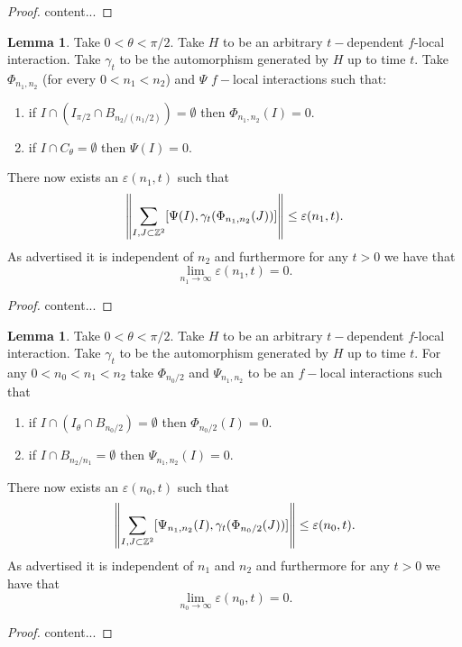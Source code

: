 \documentclass[12pt,a4paper,twoside]{article}
\newcommand{\ZZ}{\mathbb Z}
\theoremstyle{definition}
\newtheorem{lemma}[theorem]{Lemma}
\numberwithin{equation}{section}
\begin{document}
\begin{proof}
	content...
\end{proof}
\begin{lemma}\label{lem:Bound2}
	Take $0<\theta<\pi/2$. Take $H$ to be an arbitrary $t-$dependent $f$-local interaction. Take $\gamma_t$ to be the automorphism generated by $H$ up to time $t$. Take $\Phi_{n_1,n_2}$ (for every $0<n_1<n_2$) and $\Psi$ $f-$local interactions such that:
	\begin{enumerate}
		\item if $I\cap (I_{\pi/2}\cap B_{n_2/(n_1/2)})=\emptyset$ then $\Phi_{n_1,n_2}(I)=0.$
		\item if $I\cap C_{\theta}=\emptyset$ then $\Psi(I)=0.$
	\end{enumerate}
	There now exists an $\varepsilon(n_1,t)$ such that
	\begin{equation}
		\norm{\sum_{I,J\subset\ZZ^2}[\Psi(I),\gamma_t(\Phi_{n_1,n_2}(J))]}\leq\varepsilon(n_1,t).
	\end{equation}
	As advertised it is independent of $n_2$ and furthermore for any $t>0$ we have that
	\begin{equation}
		\lim_{n_1\rightarrow\infty}\varepsilon(n_1,t)=0.
	\end{equation}
\end{lemma}
\begin{proof}
	content...
\end{proof}
\begin{lemma}\label{lem:Bound3}
	Take $0<\theta<\pi/2$. Take $H$ to be an arbitrary $t-$dependent $f$-local interaction. Take $\gamma_t$ to be the automorphism generated by $H$ up to time $t$. For any $0<n_0<n_1<n_2$ take $\Phi_{n_0/2}$ and $\Psi_{n_1,n_2}$ to be an $f-$local interactions such that
	\begin{enumerate}
		\item if $I\cap (I_\theta\cap B_{n_0/2})=\emptyset$ then $\Phi_{n_0/2}(I)=0.$
		\item if $I\cap B_{n_2/n_1}=\emptyset$ then $\Psi_{n_1,n_2}(I)=0.$
	\end{enumerate}
	There now exists an $\varepsilon(n_0,t)$ such that
	\begin{equation}
		\norm{\sum_{I,J\subset\ZZ^2}[\Psi_{n_1,n_2}(I),\gamma_t(\Phi_{n_0/2}(J))]}\leq \varepsilon(n_0,t).
	\end{equation}
	As advertised it is independent of $n_1$ and $n_2$ and furthermore for any $t>0$ we have that
	\begin{equation}
		\lim_{n_0\rightarrow\infty}\varepsilon(n_0,t)=0.
	\end{equation}
\end{lemma}
\begin{proof}
	content...
\end{proof}


\end{document}
